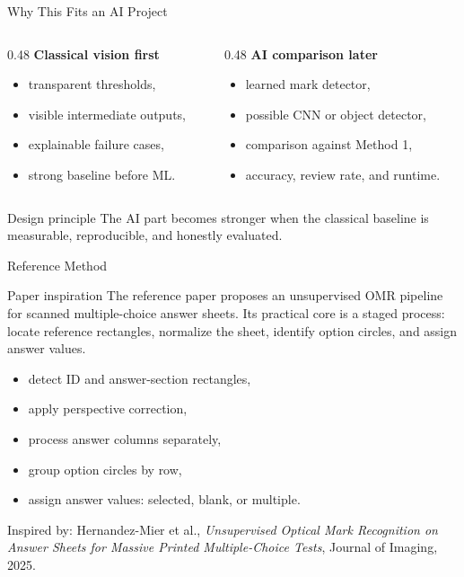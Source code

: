 \documentclass[aspectratio=169]{beamer}
\begin{document}
\begin{frame}{Why This Fits an AI Project}
  \begin{columns}[T]
    \begin{column}{0.48\textwidth}
      \textbf{Classical vision first}
      \begin{itemize}
        \item transparent thresholds,
        \item visible intermediate outputs,
        \item explainable failure cases,
        \item strong baseline before ML.
      \end{itemize}
    \end{column}
    \begin{column}{0.48\textwidth}
      \textbf{AI comparison later}
      \begin{itemize}
        \item learned mark detector,
        \item possible CNN or object detector,
        \item comparison against Method 1,
        \item accuracy, review rate, and runtime.
      \end{itemize}
    \end{column}
  \end{columns}

  \vspace{0.35cm}

  \begin{block}{Design principle}
    The AI part becomes stronger when the classical baseline is measurable, reproducible, and honestly evaluated.
  \end{block}
\end{frame}

\begin{frame}{Reference Method}
  \begin{block}{Paper inspiration}
    The reference paper proposes an unsupervised OMR pipeline for scanned multiple-choice answer sheets. Its practical core is a staged process: locate reference rectangles, normalize the sheet, identify option circles, and assign answer values.
  \end{block}

  \begin{itemize}
    \item detect ID and answer-section rectangles,
    \item apply perspective correction,
    \item process answer columns separately,
    \item group option circles by row,
    \item assign answer values: selected, blank, or multiple.
  \end{itemize}

  \vspace{0.2cm}
  \small Inspired by: Hernandez-Mier et al., \textit{Unsupervised Optical Mark Recognition on Answer Sheets for Massive Printed Multiple-Choice Tests}, Journal of Imaging, 2025.
\end{frame}
\end{document}
